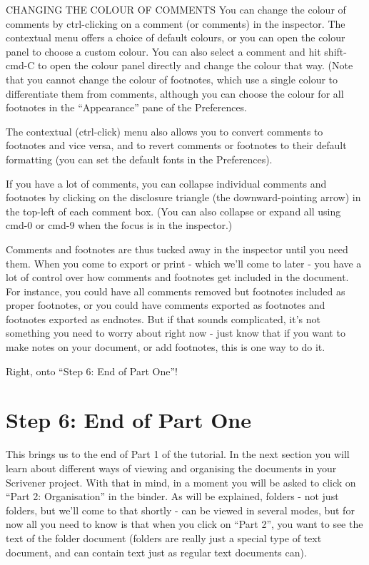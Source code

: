 \documentclass[10pt,oneside]{memoir}
\begin{document}
CHANGING THE COLOUR OF COMMENTS
You can change the colour of comments by ctrl-clicking on a comment (or comments) in the inspector. The contextual menu offers a choice of default colours, or you can open the colour panel to choose a custom colour. You can also select a comment and hit shift-cmd-C to open the colour panel directly and change the colour that way. (Note that you cannot change the colour of footnotes, which use a single colour to differentiate them from comments, although you can choose the colour for all footnotes in the ``Appearance'' pane of the Preferences.


The contextual (ctrl-click) menu also allows you to convert comments to footnotes and vice versa, and to revert comments or footnotes to their default formatting (you can set the default fonts in the Preferences).


If you have a lot of comments, you can collapse individual comments and footnotes by clicking on the disclosure triangle (the downward-pointing arrow) in the top-left of each comment box. (You can also collapse or expand all using cmd-0 or cmd-9 when the focus is in the inspector.)


Comments and footnotes are thus tucked away in the inspector until you need them. When you come to export or print - which we'll come to later - you have a lot of control over how comments and footnotes get included in the document. For instance, you could have all comments removed but footnotes included as proper footnotes, or you could have comments exported as footnotes and footnotes exported as endnotes. But if that sounds complicated, it's not something you need to worry about right now - just know that if you want to make notes on your document, or add footnotes, this is one way to do it.


Right, onto ``Step 6: End of Part One''!


\pagebreak \chapter{Step 6: End of Part One}
\label{step6:endofpartone}

This brings us to the end of Part 1 of the tutorial. In the next section you will learn about different ways of viewing and organising the documents in your Scrivener project. With that in mind, in a moment you will be asked to click on ``Part 2: Organisation'' in the binder. As will be explained, folders - not just folders, but we'll come to that shortly - can be viewed in several modes, but for now all you need to know is that when you click on ``Part 2'', you want to see the text of the folder document (folders are really just a special type of text document, and can contain text just as regular text documents can).
\end{document}

